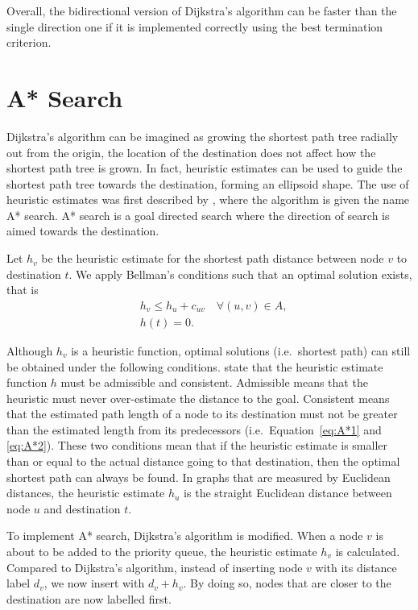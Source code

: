 Overall, the bidirectional version of Dijkstra's algorithm can be faster than the single direction one if it is implemented correctly using the best termination criterion.

\section{A* Search}\label{section:A*}
Dijkstra's algorithm can be imagined as growing the shortest path tree radially out from the origin,
the location of the destination does not affect how the shortest path tree is grown.
In fact, heuristic estimates can be used to guide the shortest path tree towards the destination,
forming an ellipsoid shape.
The use of heuristic estimates was first described by \citet{Astar},
where the algorithm is given the name A* search.
A* search is a goal directed search where the direction of search is aimed towards the destination.


Let $h_v$ be the heuristic estimate for the shortest path distance between node $v$ to destination $t$.
We apply Bellman's conditions such that an optimal solution exists, that is 
\begin{align}
    &h_v \leq h_u + c_{uv} \quad \forall(u,v) \in A, \label{eq:A*1}\\
    &h(t) = 0. \label{eq:A*2}
\end{align}

Although $h_v$ is a heuristic function,
optimal solutions (i.e.\ shortest path) can still be obtained under the following conditions.
\citet{Astar} state that the heuristic estimate function $h$ must be admissible and consistent.
Admissible means that the heuristic must never over-estimate the distance to the goal.
Consistent means that the estimated path length of a node to its destination must not be greater than the estimated length from its predecessors (i.e.\ Equation~\eqref{eq:A*1} and \eqref{eq:A*2}).
These two conditions mean that 
if the heuristic estimate is smaller than or equal to the actual distance going to that destination,
then the optimal shortest path can always be found. 
In graphs that are measured by Euclidean distances,
the heuristic estimate $h_u$ is the straight Euclidean distance between node $u$ and destination $t$.

%
To implement A* search,
Dijkstra's algorithm is modified.
When a node $v$ is about to be added to the priority queue,
the heuristic estimate $h_v$ is calculated.
Compared to Dijkstra's algorithm,
instead of inserting node $v$ with its distance label $d_v$,
we now insert with $d_v + h_v$.
By doing so,
nodes that are closer to the destination are now labelled first.


